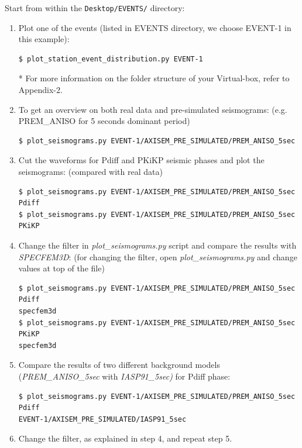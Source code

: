 \documentclass{article}
\begin{document}
Start from within the \verb|Desktop/EVENTS/| directory:

\begin{enumerate}
\item Plot one of the events (listed in EVENTS directory, we choose EVENT-1 in this example):

\begin{verbatim}
$ plot_station_event_distribution.py EVENT-1
\end{verbatim}
* For more information on the folder structure of your Virtual-box, refer to Appendix-2.

\item To get an overview on both real data and pre-simulated seismograms: (e.g. PREM\_ANISO 
for 5 seconds dominant period)
\begin{verbatim}
$ plot_seismograms.py EVENT-1/AXISEM_PRE_SIMULATED/PREM_ANISO_5sec
\end{verbatim}

\item Cut the waveforms for Pdiff and PKiKP seismic phases and plot the seismograms: 
(compared with real data)
\begin{verbatim}
$ plot_seismograms.py EVENT-1/AXISEM_PRE_SIMULATED/PREM_ANISO_5sec Pdiff
$ plot_seismograms.py EVENT-1/AXISEM_PRE_SIMULATED/PREM_ANISO_5sec PKiKP
\end{verbatim}

\item Change the filter in \textit{plot\_seismograms.py} script and compare the results with 
\textit{SPECFEM3D}: (for changing the filter, open \textit{plot\_seismograms.py} and change 
values at top of the file)

\begin{verbatim}
$ plot_seismograms.py EVENT-1/AXISEM_PRE_SIMULATED/PREM_ANISO_5sec Pdiff 
specfem3d
$ plot_seismograms.py EVENT-1/AXISEM_PRE_SIMULATED/PREM_ANISO_5sec PKiKP 
specfem3d
\end{verbatim}

\item Compare the results of two different background models (\textit{PREM\_ANISO\_5sec} with 
\textit{IASP91\_5sec)} for Pdiff phase:

\begin{verbatim}
$ plot_seismograms.py EVENT-1/AXISEM_PRE_SIMULATED/PREM_ANISO_5sec Pdiff 
EVENT-1/AXISEM_PRE_SIMULATED/IASP91_5sec
\end{verbatim}

\item Change the filter, as explained in step 4, and repeat step 5.


\end{enumerate}
\end{document}
